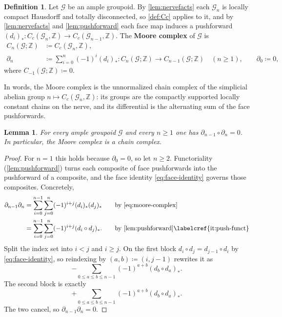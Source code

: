 \documentclass{extracta-temp-26}
\numberwithin{equation}{section}
\newtheorem{lem}[teo]{Lemma}
\theoremstyle{definition}
\newtheorem{defi}[teo]{Definition}
\theoremstyle{remark}
\newcommand{\G}{\mathcal{G}}
\newcommand{\Z}{\mathbb{Z}}
\newcommand{\term}[1]{\textbf{#1}}
\begin{document}
\begin{defi}\label{def:moore}
Let \(\G\) be an ample groupoid.
By \cref{lem:nervefacts} each \(\G_n\) is locally compact Hausdorff and totally disconnected, so \cref{def:Cc} applies to it, and by \cref{lem:nervefacts} and \cref{lem:pushforward} each face map induces a pushforward \((d_i)_*\colon C_c(\G_n,\Z)\to C_c(\G_{n-1},\Z)\).
The \term{Moore complex} of \(\G\) is
\begin{equation}\label{eq:moore-complex}
\begin{aligned}
C_n(\G;\Z)&\coloneqq C_c(\G_n,\Z),\\
\partial_n&\coloneqq\sum_{i=0}^n(-1)^i(d_i)_*\colon C_n(\G;\Z)\to C_{n-1}(\G;\Z)\quad(n\ge 1),
\qquad
\partial_0\coloneqq 0,
\end{aligned}
\end{equation}
where \(C_{-1}(\G;\Z)\coloneqq 0\).
\end{defi}

In words, the Moore complex is the unnormalized chain complex of the simplicial abelian group \(n\mapsto C_c(\G_n,\Z)\): its groups are the compactly supported locally constant chains on the nerve, and its differential is the alternating sum of the face pushforwards.

\begin{lem}\label{lem:boundary}
For every ample groupoid \(\G\) and every \(n\ge 1\) one has \(\partial_{n-1}\circ\partial_n=0\).
In particular, the Moore complex is a chain complex.
\end{lem}

\begin{proof}
For \(n=1\) this holds because \(\partial_0=0\), so let \(n\ge 2\).
Functoriality (\cref{lem:pushforward}) turns each composite of face pushforwards into the pushforward of a composite, and the face identity \eqref{eq:face-identity} governs those composites.
Concretely,
\begin{equation}\label{eq:boundary-square}
\begin{aligned}
\partial_{n-1}\partial_n
&=\sum_{i=0}^{n-1}\sum_{j=0}^{n}(-1)^{i+j}(d_i)_*(d_j)_*
&&\quad\text{by \eqref{eq:moore-complex}}\\
&=\sum_{i=0}^{n-1}\sum_{j=0}^{n}(-1)^{i+j}(d_i\circ d_j)_*.
&&\quad\text{by \cref{lem:pushforward}\labelcref{it:push-funct}}
\end{aligned}
\end{equation}
Split the index set into \(i<j\) and \(i\ge j\).
On the first block \(d_i\circ d_j=d_{j-1}\circ d_i\) by \eqref{eq:face-identity}, so reindexing by \((a,b)\coloneqq(i,j-1)\) rewrites it as
\begin{equation}\label{eq:boundary-first-block}
-\sum_{0\le a\le b\le n-1}(-1)^{a+b}(d_b\circ d_a)_*.
\end{equation}
The second block is exactly
\begin{equation}\label{eq:boundary-second-block}
+\sum_{0\le a\le b\le n-1}(-1)^{a+b}(d_b\circ d_a)_*.
\end{equation}
The two cancel, so \(\partial_{n-1}\partial_n=0\).
\end{proof}
\end{document}
